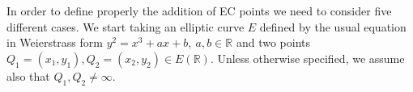 \begin{center}
	\noindent
	\label{fig:figure2}
\end{center}
\noindent
In order to define properly the addition of EC points we need to consider five different cases. We start taking an elliptic curve $E$ defined by the usual equation in Weierstrass form $y^2 = x^3 + ax + b, \ a,b \in \mathbb{R}$ and two points $Q_1 = (x_1, y_1), Q_2 = (x_2, y_2) \in E(\mathbb{R})$. Unless otherwise specified, we assume also that $Q_1, Q_2 \neq \infty$.
